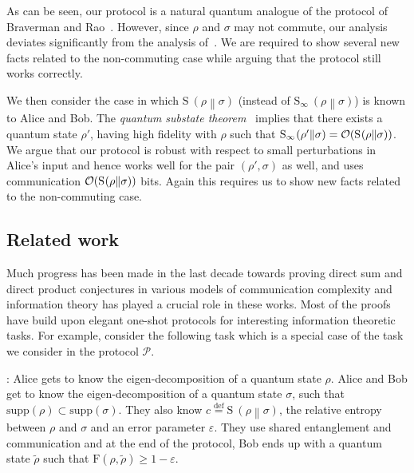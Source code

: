 \documentclass[11pt,a4paper]{article}
\def\F{\mathrn{F}}
\def\O{\CMcal{O}}
\theoremstyle{plain}
\theoremstyle{definition}
\newcommand {\br} [1] {\ensuremath{ \left( #1 \right) }}
\newcommand {\minusspace} {\: \! \!}
\newcommand {\fn} [2] {\ensuremath{ #1 \minusspace \br{ #2 } }}
\newcommand {\defeq} {\ensuremath{ \stackrel{\mathrm{def}}{=} }}
\newcommand {\relent} [2] {\fn{\mathrm{S}}{#1 \middle\| #2}}
\newcommand {\rminent} [2] {\fn{\mathrm{S}_{\infty}}{#1 \middle\| #2}}
\newcommand {\Prot}{\mathcal{P}}
\def\ve{{\varepsilon}}
\def\F{\mathrm{F}}
\begin{document}
As can be seen, our protocol is a natural quantum analogue of the protocol of Braverman and Rao~\cite{Braverman2011}.  However, since $\rho$ and $\sigma$ may not commute, our analysis deviates significantly from the analysis of~\cite{Braverman2011}. We are required to show several new facts related to the non-commuting case while arguing that the protocol still works correctly.  

We then consider the case in which  $\relent{\rho}{\sigma}$ (instead of $\rminent{\rho}{\sigma}$) is known to Alice and Bob. The {\em quantum substate theorem}~\cite{Jain2002, JainNayak:2012} implies that there exists a quantum state $\rho'$, having high fidelity with $\rho$ such that  $\rminent{\rho'}{\sigma} = \O(\relent{\rho}{\sigma})$. We argue that our protocol is robust with respect to  small perturbations in Alice's input and hence works well for the pair $(\rho', \sigma)$ as well, and uses  communication $\O(\relent{\rho}{\sigma})$ bits. Again this requires us to show new facts related to the non-commuting case.

\subsection*{Related work} 
 Much progress has been made in the last decade towards proving direct sum and direct product conjectures in various models of communication complexity and information theory has played a crucial role in these works. Most of the proofs have build upon elegant one-shot  protocols for interesting information theoretic tasks. For example, consider the following task which is a special case of the task we consider in the protocol $\Prot$.

\bigskip

:  Alice gets to know the eigen-decomposition of a quantum state $\rho$. Alice and Bob get to know the eigen-decomposition of a quantum state $\sigma$, such that $\text{supp}(\rho) \subset \text{supp}(\sigma)$. They also know $c \defeq \relent{\rho}{\sigma}$, the relative entropy between $\rho$ and $\sigma$ and an error parameter $\ve$. They  use shared entanglement and communication and at the end of the protocol, Bob ends up with a quantum state $\tilde{\rho}$ such that $\F(\rho, \tilde{\rho}) \geq 1 - \ve$.

\bigskip
\end{document}

